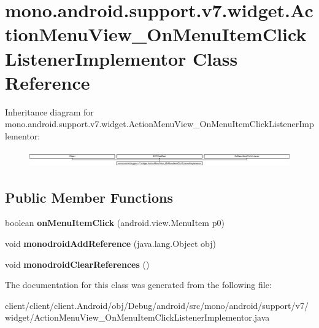\hypertarget{classmono_1_1android_1_1support_1_1v7_1_1widget_1_1ActionMenuView__OnMenuItemClickListenerImplementor}{}\section{mono.\+android.\+support.\+v7.\+widget.\+Action\+Menu\+View\+\_\+\+On\+Menu\+Item\+Click\+Listener\+Implementor Class Reference}
\label{classmono_1_1android_1_1support_1_1v7_1_1widget_1_1ActionMenuView__OnMenuItemClickListenerImplementor}
Inheritance diagram for mono.\+android.\+support.\+v7.\+widget.\+Action\+Menu\+View\+\_\+\+On\+Menu\+Item\+Click\+Listener\+Implementor\+:\begin{figure}[H]
\begin{center}
\leavevmode
\includegraphics[height=0.719332cm]{classmono_1_1android_1_1support_1_1v7_1_1widget_1_1ActionMenuView__OnMenuItemClickListenerImplementor}
\end{center}
\end{figure}
\subsection*{Public Member Functions}
\begin{DoxyCompactItemize}
\item 
\hypertarget{classmono_1_1android_1_1support_1_1v7_1_1widget_1_1ActionMenuView__OnMenuItemClickListenerImplementor_aa7f3b619c6a59d9cdca534581c1a6296}{}boolean {\bfseries on\+Menu\+Item\+Click} (android.\+view.\+Menu\+Item p0)\label{classmono_1_1android_1_1support_1_1v7_1_1widget_1_1ActionMenuView__OnMenuItemClickListenerImplementor_aa7f3b619c6a59d9cdca534581c1a6296}

\item 
\hypertarget{classmono_1_1android_1_1support_1_1v7_1_1widget_1_1ActionMenuView__OnMenuItemClickListenerImplementor_ae2429823c873f4a58b4cf51c81bc06e9}{}void {\bfseries monodroid\+Add\+Reference} (java.\+lang.\+Object obj)\label{classmono_1_1android_1_1support_1_1v7_1_1widget_1_1ActionMenuView__OnMenuItemClickListenerImplementor_ae2429823c873f4a58b4cf51c81bc06e9}

\item 
\hypertarget{classmono_1_1android_1_1support_1_1v7_1_1widget_1_1ActionMenuView__OnMenuItemClickListenerImplementor_a9e0f4ab4d26d48e5e567bd67f4464001}{}void {\bfseries monodroid\+Clear\+References} ()\label{classmono_1_1android_1_1support_1_1v7_1_1widget_1_1ActionMenuView__OnMenuItemClickListenerImplementor_a9e0f4ab4d26d48e5e567bd67f4464001}

\end{DoxyCompactItemize}


The documentation for this class was generated from the following file\+:\begin{DoxyCompactItemize}
\item 
client/client/client.\+Android/obj/\+Debug/android/src/mono/android/support/v7/widget/Action\+Menu\+View\+\_\+\+On\+Menu\+Item\+Click\+Listener\+Implementor.\+java\end{DoxyCompactItemize}
